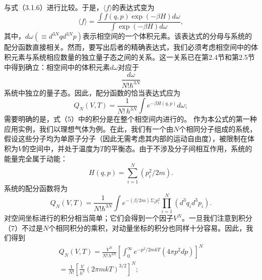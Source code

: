 与式（3.1.6）进行比较。于是，\(\langle f \rangle\)的表达式变为
\begin{equation}\tag{3.5.3}\label{eq:3.5.3}
\langle f \rangle = \frac { \int f ( q , p ) \exp ( - \beta H ) d \omega } { \int \exp ( - \beta H ) d \omega } ,
\end{equation}
其中，\(d\omega(\equiv d^{3N}q d^{3N}p)\)表示相空间的一个体积元素。该表达式的分母与系统的配分函数直接相关。然而，要写出后者的精确表达式，我们必须考虑相空间中的体积元素与系统相应数量的独立量子态之间的关系。这一关系已在第2.4节和第2.5节中得到确立：相空间中的体积元素\(d\omega\)对应于
\begin{equation}\tag{3.5.4}\label{eq:3.5.4}
\frac { d \omega } { N ! \hbar ^{3 N} }
\end{equation}
系统中独立的量子态。因此，配分函数的恰当表达式应为
\begin{equation}\tag{3.5.5}\label{eq:3.5.5}
Q _ { N } ( V , T ) = \frac { 1 } { N ! \, h ^{3 N} } \int e ^{- \beta H ( q , p )} d \omega ;
\end{equation}
需要明确的是，式（5）中的积分是在整个相空间内进行的。
作为本公式的第一种应用实例，我们以理想气体为例。在此，我们有一个由\(N\)个相同分子组成的系统，假设这些分子均为单原子分子（因此无需考虑其内部的运动自由度），被限制在体积为\(V\)的空间中，并处于温度为\(T\)的平衡态。由于不涉及分子间相互作用，系统的能量完全属于动能：
\begin{equation}\tag{3.5.6}\label{eq:3.5.6}
H ( q , p ) = \sum _ { i = 1 } ^{N} ( p _ { i } ^{2} / 2 m ) .
\end{equation}
系统的配分函数将为
\begin{equation}\tag{3.5.7}\label{eq:3.5.7}
Q _ { N } ( V , T ) = \frac { 1 } { N ! \hbar ^{3 N} } \int e ^{- ( \beta / 2 m ) \Sigma _ { i} p _ { i } ^{2} } \prod _ { i = 1 } ^{N} ( d ^{3} q _ { i } d ^{3} p _ { i } ) .
\end{equation}
对空间坐标进行的积分相当简单；它们会得到一个因子\(V^{N}\)。一旦我们注意到积分（7）不过是\(N\)个相同积分的乘积，对动量坐标的积分也同样十分容易。因此，我们得到
\begin{equation}\tag{3.5.8}\label{eq:3.5.8}
\begin{array}{r} { Q _ { N } ( V , T ) = \frac { V ^{N} } { N ! \, h ^{3 N} } \left[ \int _ { 0 } ^{\infty} e ^{- p ^ { 2} / 2 m k T } \left( 4 \pi p ^{2} d p \right) \right] ^{N} } \\{ = \frac { 1 } { N ! } \left[ \frac { V } { h ^{3} } ( 2 \pi m k T ) ^{3 / 2} \right] ^{N} ; } \end{array}
\end{equation}
